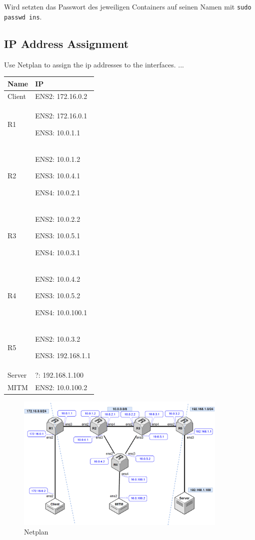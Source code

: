\documentclass[11pt,titlepage]{article}
\newenvironment{shadedquotation}
 {\begin{shaded*}
  \quoting[leftmargin=0pt, vskip=0pt]
 }
 {\endquoting
 \end{shaded*}
}
\begin{document}
Wird setzten das Passwort des jeweiligen Containers auf seinen Namen mit \lstinline!sudo passwd ins!.

\subsection{IP Address Assignment}
\label{subsec:IPAddressAssignment}
\begin{shadedquotation}
  Use Netplan to assign the ip addresses to the interfaces. ...
\end{shadedquotation}

\begin{tabular}{ |p{5cm}|p{9cm}|}
  \hline
  \textbf{Name} & \textbf{IP} \\
  \hline
  Client & ENS2: 172.16.0.2 \\
  \hline
  R1 & ENS2: 172.16.0.1 \par ENS3: 10.0.1.1 \\
  \hline
  R2 & ENS2: 10.0.1.2 \par ENS3: 10.0.4.1 \par ENS4: 10.0.2.1 \\
  \hline
  R3 & ENS2: 10.0.2.2 \par ENS3: 10.0.5.1 \par ENS4: 10.0.3.1 \\
  \hline
  R4 & ENS2: 10.0.4.2 \par ENS3: 10.0.5.2 \par ENS4: 10.0.100.1 \\
  \hline
  R5 & ENS2: 10.0.3.2 \par ENS3: 192.168.1.1 \\
  \hline
  Server & ?: 192.168.1.100 \\
  \hline
  MITM & ENS2: 10.0.100.2 \\
  \hline
\end{tabular}

\begin{figure}[H]
  \begin{center}
    \includegraphics[width=0.90\textwidth]{images/netplan.png}
    \caption{Netplan}
    \label{fig:Netplan}
  \end{center}
\end{figure}
\end{document}
